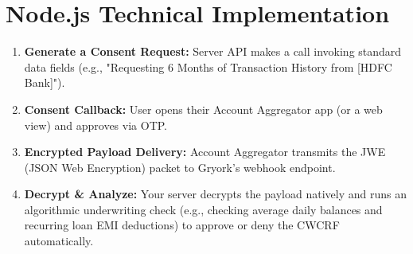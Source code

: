 \documentclass[11pt, a4paper]{report}
\begin{document}
\section{Node.js Technical Implementation}
\begin{enumerate}[label=\textbf{\textcolor{gryorkBlue}{\arabic*.}}, itemsep=0.3em]
    \item \textbf{Generate a Consent Request:} Server API makes a call invoking standard data fields (e.g., "Requesting 6 Months of Transaction History from [HDFC Bank]").
    \item \textbf{Consent Callback:} User opens their Account Aggregator app (or a web view) and approves via OTP.
    \item \textbf{Encrypted Payload Delivery:} Account Aggregator transmits the JWE (JSON Web Encryption) packet to Gryork's webhook endpoint.
    \item \textbf{Decrypt \& Analyze:} Your server decrypts the payload natively and runs an algorithmic underwriting check (e.g., checking average daily balances and recurring loan EMI deductions) to approve or deny the CWCRF automatically.
\end{enumerate}
\end{document}
